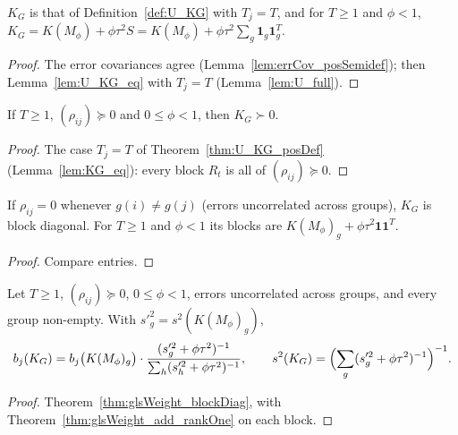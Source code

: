 \begin{lemma}\label{lem:KG_eq}
  \leanok
  $K_G$ is that of Definition~\ref{def:U_KG} with $T_j = T$, and for
  $T \ge 1$ and $\phi < 1$, $K_G = K(M_\phi) + \phi\tau^2 S
  = K(M_\phi) + \phi\tau^2\sum_g\mathbf 1_g\mathbf 1_g^T$.
\end{lemma}
\begin{proof}
  \leanok
  The error covariances agree (Lemma~\ref{lem:errCov_posSemidef}); then
  Lemma~\ref{lem:U_KG_eq} with $T_j = T$ (Lemma~\ref{lem:U_full}).
\end{proof}

\begin{theorem}\label{thm:KG_posDef}
  \leanok
  If $T \ge 1$, $(\rho_{ij}) \succeq 0$ and $0 \le \phi < 1$, then $K_G \succ 0$.
\end{theorem}
\begin{proof}
  \leanok
  The case $T_j = T$ of Theorem~\ref{thm:U_KG_posDef} (Lemma~\ref{lem:KG_eq}): every
  block $R_t$ is all of $(\rho_{ij}) \succeq 0$.
\end{proof}

\begin{lemma}[Blocks of $K_G$]\label{lem:block_KG}
  \leanok
  If $\rho_{ij} = 0$ whenever $g(i) \ne g(j)$ (errors uncorrelated across
  groups), $K_G$ is block diagonal. For $T \ge 1$ and $\phi < 1$ its blocks are
  $K(M_\phi)_g + \phi\tau^2\mathbf 1\mathbf 1^T$.
\end{lemma}
\begin{proof}
  \leanok
  Compare entries.
\end{proof}

\begin{theorem}\label{thm:glsWeight_KG}
  \leanok
  Let $T \ge 1$, $(\rho_{ij}) \succeq 0$, $0 \le \phi < 1$, errors uncorrelated
  across groups, and every group non-empty. With $s'^2_g = s^2(K(M_\phi)_g)$,
  \[
    b_j(K_G) = b_j\bigl(K(M_\phi)_g\bigr)\cdot
      \frac{(s'^2_g + \phi\tau^2)^{-1}}{\sum_h (s'^2_h + \phi\tau^2)^{-1}},
    \qquad
    s^2(K_G) = \Bigl(\sum_g (s'^2_g + \phi\tau^2)^{-1}\Bigr)^{-1}.
  \]
\end{theorem}
\begin{proof}
  \leanok
  Theorem~\ref{thm:glsWeight_blockDiag}, with Theorem~\ref{thm:glsWeight_add_rankOne}
  on each block.
\end{proof}

